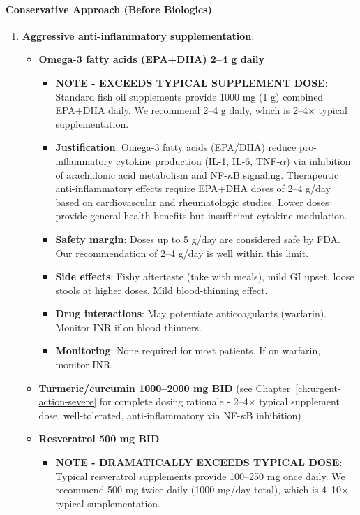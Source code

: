 \paragraph{Conservative Approach (Before Biologics)}
\begin{enumerate}
    \item \textbf{Aggressive anti-inflammatory supplementation}:
    \begin{itemize}
        \item \textbf{Omega-3 fatty acids (EPA+DHA) 2--4 g daily}
        \begin{itemize}
            \item \textbf{NOTE - EXCEEDS TYPICAL SUPPLEMENT DOSE}: Standard fish oil supplements provide 1000 mg (1 g) combined EPA+DHA daily. We recommend 2--4 g daily, which is 2--4$\times$ typical supplementation.
            \item \textbf{Justification}: Omega-3 fatty acids (EPA/DHA) reduce pro-inflammatory cytokine production (IL-1, IL-6, TNF-$\alpha$) via inhibition of arachidonic acid metabolism and NF-$\kappa$B signaling. Therapeutic anti-inflammatory effects require EPA+DHA doses of 2--4 g/day based on cardiovascular and rheumatologic studies. Lower doses provide general health benefits but insufficient cytokine modulation.
            \item \textbf{Safety margin}: Doses up to 5 g/day are considered safe by FDA. Our recommendation of 2--4 g/day is well within this limit.
            \item \textbf{Side effects}: Fishy aftertaste (take with meals), mild GI upset, loose stools at higher doses. Mild blood-thinning effect.
            \item \textbf{Drug interactions}: May potentiate anticoagulants (warfarin). Monitor INR if on blood thinners.
            \item \textbf{Monitoring}: None required for most patients. If on warfarin, monitor INR.
        \end{itemize}
        \item \textbf{Turmeric/curcumin 1000--2000 mg BID} (see Chapter~\ref{ch:urgent-action-severe} for complete dosing rationale - 2--4$\times$ typical supplement dose, well-tolerated, anti-inflammatory via NF-$\kappa$B inhibition)
        \item \textbf{Resveratrol 500 mg BID}
        \begin{itemize}
            \item \textbf{NOTE - DRAMATICALLY EXCEEDS TYPICAL DOSE}: Typical resveratrol supplements provide 100--250 mg once daily. We recommend 500 mg twice daily (1000 mg/day total), which is 4--10$\times$ typical supplementation.

\end{itemize}
\end{itemize}
\end{enumerate}
